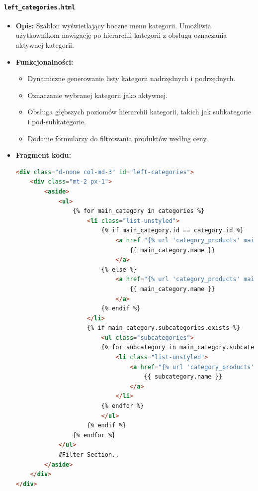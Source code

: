 \documentclass[12pt,a4paper,oneside]{article}
\theoremstyle{definition}
\numberwithin{equation}{section}
\begin{document}
\paragraph{\texttt{left\_categories.html}}
\begin{itemize}
    \item \textbf{Opis:}
    Szablon wyświetlający boczne menu kategorii. Umożliwia użytkownikom nawigację po hierarchii kategorii z obsługą oznaczania aktywnej kategorii.
    \item \textbf{Funkcjonalności:}
    \begin{itemize}
        \item Dynamiczne generowanie listy kategorii nadrzędnych i podrzędnych.
        \item Oznaczanie wybranej kategorii jako aktywnej.
        \item Obsługa głębszych poziomów hierarchii kategorii, takich jak subkategorie i pod-subkategorie.
        \item Dodanie formularzy do filtrowania produktów według ceny.
    \end{itemize}
    \item \textbf{Fragment kodu:}
    \begin{lstlisting}[language=HTML, caption=Fragment szablonu left\_categories.html]
<div class="d-none col-md-3" id="left-categories">
    <div class="mt-2 px-1">
        <aside>
            <ul>
                {% for main_category in categories %}
                    <li class="list-unstyled">
                        {% if main_category.id == category.id %}
                            <a href="{% url 'category_products' main_category.id %}" class="active">
                                {{ main_category.name }}
                            </a>
                        {% else %}
                            <a href="{% url 'category_products' main_category.id %}">
                                {{ main_category.name }}
                            </a>
                        {% endif %}
                    </li>
                    {% if main_category.subcategories.exists %}
                        <ul class="subcategories">
                        {% for subcategory in main_category.subcategories.all %}
                            <li class="list-unstyled">
                                <a href="{% url 'category_products' subcategory.id %}" class="fw-bold">
                                    {{ subcategory.name }}
                                </a>
                            </li>
                        {% endfor %}
                        </ul>
                    {% endif %}
                {% endfor %}
            </ul>
            #Filter Section..
        </aside>
    </div>
</div>
    \end{lstlisting}
\end{itemize}
\end{document}
